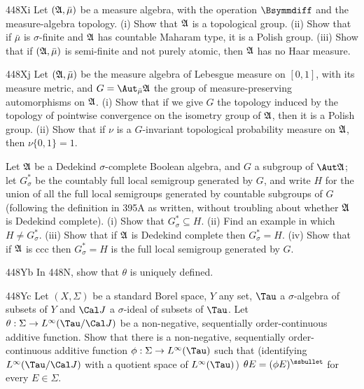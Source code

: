 {\spheader 448Xi Let $(\frak A,\bar\mu)$ be a measure algebra, with the
operation $\Bsymmdiff$ and the measure-algebra topology.   (i) Show that
$\frak A$ is a topological group.   (ii) Show that if $\bar\mu$ is
$\sigma$-finite and $\frak A$ has countable Maharam type, it is a Polish
group.   (iii) Show that if $(\frak A,\bar\mu)$ is semi-finite and not
purely atomic, then $\frak A$ has no Haar measure.

\spheader 448Xj Let $(\frak A,\bar\mu)$ be the measure algebra of
Lebesgue measure on $[0,1]$, with its measure metric, and
$G=\Aut_{\bar\mu}\frak A$ the group of measure-preserving automorphisms
on $\frak A$.   (i) Show that if we give $G$ the topology induced by the
topology of pointwise convergence on
the isometry group of $\frak A$, then it is a
Polish group.     (ii) Show that if $\nu$ is a
$G$-invariant topological probability measure on $\frak A$, then
$\nu\{0,1\}=1$.

Let $\frak A$ be a Dedekind $\sigma$-complete Boolean algebra, and $G$ a
subgroup of $\Aut\frak A$;  let $G^*_{\sigma}$ be the countably full
local semigroup generated by $G$, and write $H$ for the union of all the
full local semigroups generated by countable subgroups of $G$ (following
the definition in 395A as written, without troubling about whether
$\frak A$ is Dedekind complete).   (i) Show that
$G^*_{\sigma}\subseteq H$.   (ii) Find an example in which
$H\ne G^*_{\sigma}$.   (iii) Show
that if $\frak A$ is Dedekind complete then $G^*_{\sigma}=H$.   (iv)
Show that if $\frak A$ is ccc then $G^*_{\sigma}=H$ is the full local
semigroup generated by $G$.

\spheader 448Yb In 448N, show that $\theta$ is uniquely defined.

\spheader 448Yc Let $(X,\Sigma)$ be a standard Borel space, $Y$ any
set, $\Tau$ a $\sigma$-algebra of subsets of $Y$ and $\Cal J$ a
$\sigma$-ideal of subsets of $\Tau$.
Let $\theta:\Sigma\to L^{\infty}(\Tau/\Cal J)$ be a non-negative,
sequentially
order-continuous additive function.   Show that there is a
non-negative, sequentially order-continuous additive function
$\phi:\Sigma\to L^{\infty}(\Tau)$ such that (identifying
$L^{\infty}(\Tau/\Cal J)$ with a quotient space of $L^{\infty}(\Tau)$)
$\theta E=(\phi E)^{\ssbullet}$ for every $E\in\Sigma$.
}%


